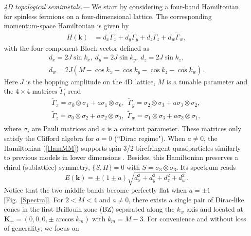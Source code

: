 \documentclass[twocolumn,prl,10pt,superscriptaddress]{revtex4}
\begin{document}
\emph{4D topological semimetals.---}
We start by considering a four-band Hamiltonian for spinless fermions on a four-dimensional lattice. The corresponding momentum-space Hamiltonian is given by
\begin{equation}
\begin{aligned}\label{HamMM}
H(\boldsymbol k)&=d_x\tilde{\Gamma}_x+d_y\tilde{\Gamma}_y+ d_z\tilde{\Gamma}_z+d_w\tilde{\Gamma}_w,
\end{aligned}
\end{equation}
with the four-component Bloch vector defined as
\begin{equation}
\begin{aligned}
d_x=2J\sin k_x,~d_y=2J\sin k_y,~d_z=2J\sin k_z,\\
d_w=2J(M-\cos k_x-\cos k_y-\cos k_z-\cos k_w).
\end{aligned}
\end{equation}
Here $J$ is the hopping amplitude on the 4D lattice, $M$ is a tunable parameter and the $4\times4$ matrices $\tilde{\Gamma}_i$
read
\begin{equation}
\begin{aligned}
\tilde{\Gamma}_x=\sigma_0\otimes\sigma_1+a\sigma_1\otimes\sigma_0,~~
\tilde{\Gamma}_y=\sigma_2\otimes\sigma_3+a\sigma_3\otimes\sigma_2,\\
\tilde{\Gamma}_z=\sigma_0\otimes\sigma_2+a\sigma_2\otimes\sigma_0,~~
\tilde{\Gamma}_w=\sigma_1\otimes\sigma_3+a\sigma_3\otimes\sigma_1, \nonumber \\
 \end{aligned}
\end{equation}
where $\sigma_i$ are Pauli matrices and $a$ is a constant parameter. These matrices only satisfy the Clifford algebra for $a=0$ (``Dirac regime"). When $a\ne0$, the Hamiltonian (\ref{HamMM}) supports spin-3/2 birefringent quasiparticles similarly to previous models in lower dimensions \cite{Lan,Kennett,Juricic,Bradlyn,Grushin2}.
Besides, this Hamiltonian preserves a chiral (sublattice) symmetry, $\{S,H\}=0$ with $S=\sigma_3\otimes\sigma_3$.
Its spectrum reads
\begin{equation}
E(\boldsymbol k)=\pm (1\pm a)\sqrt{d_x^2+d_y^2+d_z^2+d_w^2}.
\end{equation}
Notice that the two middle bands become perfectly flat when $a=\pm 1$ [Fig.~\ref{Spectra}].
For $2<M<4$ and $a\neq 0$, there exists a single pair of Dirac-like cones in the first Brillouin zone (BZ) separated along the $k_w$ axis and located at ${\boldsymbol K}_{\pm} =(0,0,0,\pm
\arccos k_m)$ with $k_m=M-3$. For convenience and without loss of generality, we focus on
\end{document}
